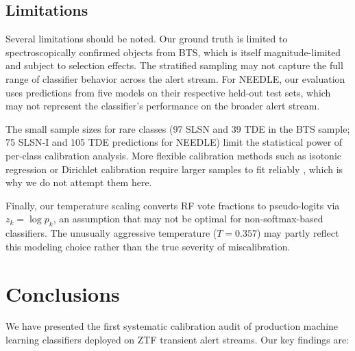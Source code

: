 \documentclass[twocolumn]{aastex631}
\begin{document}
\subsection{Limitations}

Several limitations should be noted. Our ground truth is limited to spectroscopically confirmed objects from BTS, which is itself magnitude-limited and subject to selection effects. The stratified sampling may not capture the full range of classifier behavior across the alert stream. For NEEDLE, our evaluation uses predictions from five models on their respective held-out test sets, which may not represent the classifier's performance on the broader alert stream.

The small sample sizes for rare classes (97 SLSN and 39 TDE in the BTS sample; 75 SLSN-I and 105 TDE predictions for NEEDLE) limit the statistical power of per-class calibration analysis. More flexible calibration methods such as isotonic regression or Dirichlet calibration require larger samples to fit reliably \citep{vaicenavicius2019}, which is why we do not attempt them here.

Finally, our temperature scaling converts RF vote fractions to pseudo-logits via $z_k = \log p_k$, an assumption that may not be optimal for non-softmax-based classifiers. The unusually aggressive temperature ($T = 0.357$) may partly reflect this modeling choice rather than the true severity of miscalibration.


\section{Conclusions} \label{sec:conclusions}

We have presented the first systematic calibration audit of production machine learning classifiers deployed on ZTF transient alert streams. Our key findings are:
\end{document}
